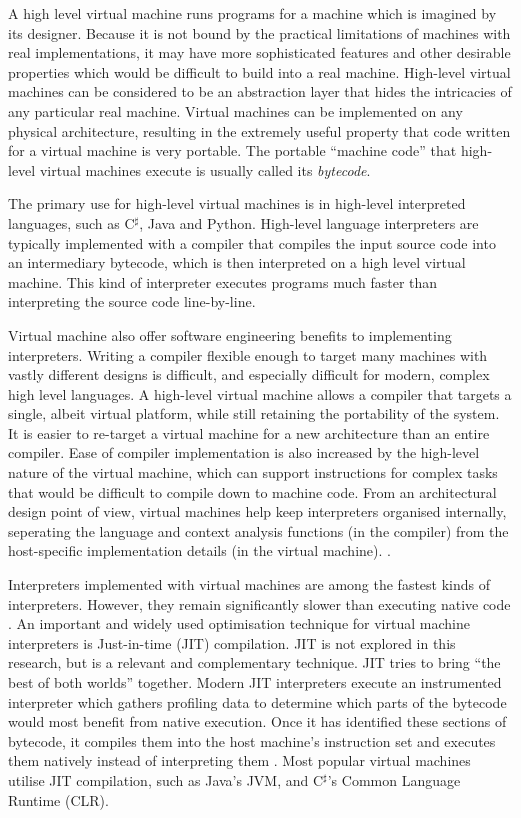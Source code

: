 		A high level virtual machine runs programs for a machine which is imagined by its designer. Because it is not bound by the practical limitations of machines with real implementations, it may have more sophisticated features and other desirable properties which would be difficult to build into a real machine. High-level virtual machines can be considered to be an abstraction layer that hides the intricacies of any particular real machine. Virtual machines can be implemented on any physical architecture, resulting in the extremely useful property that code written for a virtual machine is very portable. The portable ``machine code'' that high-level virtual machines execute is usually called its \emph{bytecode}. 
		
		The primary use for high-level virtual machines is in high-level interpreted languages, such as C$^\sharp$, Java and Python. High-level language interpreters are typically implemented with a compiler that compiles the input source code into an intermediary bytecode, which is then interpreted on a high level virtual machine. This kind of interpreter executes programs much faster than interpreting the source code line-by-line.
		
		Virtual machine also offer software engineering benefits to implementing interpreters. Writing a compiler flexible enough to target many machines with vastly different designs is difficult, and especially difficult for modern, complex high level languages. A high-level virtual machine allows a compiler that targets a single, albeit virtual platform, while still retaining the portability of the system. It is easier to re-target a virtual machine for a new architecture than an entire compiler. Ease of compiler implementation is also increased by the high-level nature of the virtual machine, which can support instructions for complex tasks that would be difficult to compile down to machine code. From an architectural design point of view, virtual machines help keep interpreters organised internally, seperating the language and context analysis functions (in the compiler) from the host-specific implementation details (in the virtual machine). \citep{structureinterpreters}.
		
		Interpreters implemented with virtual machines are among the fastest kinds of interpreters\citep{modernarchvm}. However, they remain significantly slower than executing native code \citep{optimizingindirectbranch}. An important and widely used optimisation technique for virtual machine interpreters is Just-in-time (JIT) compilation. JIT is not explored in this research, but is a relevant and complementary technique. JIT tries to bring ``the best of both worlds'' together. Modern JIT interpreters execute an instrumented interpreter which gathers profiling data to determine which parts of the bytecode would most benefit from native execution. Once it has identified these sections of bytecode, it compiles them into the host machine's instruction set and executes them natively instead of interpreting them \citep{historyjit}. Most popular virtual machines utilise JIT compilation, such as Java's JVM, and C$^\sharp$'s Common Language Runtime (CLR).
		
